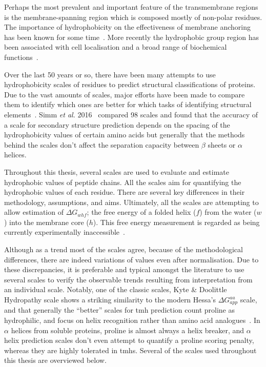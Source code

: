 Perhaps the most prevalent and important feature of the transmembrane regions is the membrane\--spanning region which is composed mostly of non-polar residues.
The importance of hydrophobicity on the effectiveness of membrane anchoring has been known for some time~\cite{Davis1985}.
More recently the hydrophobic group region has been associated with cell localisation and a broad range of biochemical functions~\cite{Junne2010, Sharpe2010, Wong2012}.

Over the last 50 years or so, there have been many attempts to use hydrophobicity scales of residues to predict structural classifications of proteins.
Due to the vast amounts of scales, major efforts have been made to compare them to identify which ones are better for which tasks of identifying structural elements~\cite{Simm2016, Peters2014}.
Simm \textit{ et al.} 2016~\cite{Simm2016} compared 98 scales and found that the accuracy of a scale for secondary structure prediction depends on the spacing of the hydrophobicity values of certain amino acids but generally that the methods behind the scales don't affect the separation capacity between $ \beta $ sheets or $ \alpha $ helices.

Throughout this thesis, several scales are used to evaluate and estimate hydrophobic values of peptide chains.
All the scales aim for quantifying the hydrophobic values of each residue.
There are several key differences in their methodology, assumptions, and aims.
Ultimately, all the scales are attempting to allow estimation of ${\Delta G}_{whf}$; the free energy of a folded helix ($ f $) from the water ($w$) into the membrane core ($h$).
This free energy measurement is regarded as being currently experimentally inaccessible~\cite{Cymer2015}.

Although as a trend most of the scales agree, because of the methodological differences, there are indeed variations of values even after normalisation.
Due to these discrepancies, it is preferable and typical amongst the literature to use several scales to verify the observable trends resulting from interpretation from an individual scale.
Notably, one of the classic scales, Kyte \& Doolittle Hydropathy scale shows a striking similarity to the modern Hessa's ${\Delta G}_{app}^{aa}$ scale, and that generally the ``better'' scales for \gls{tmh} prediction count proline as hydrophilic, and focus on helix recognition rather than amino acid analogues~\cite{Peters2014}.
In $\alpha$ helices from soluble proteins, proline is almost always a helix breaker, and $\alpha$ helix prediction scales don't even attempt to quantify a proline scoring penalty, whereas they are highly tolerated in \gls{tmh}s.
Several of the scales used throughout this thesis are overviewed below.

